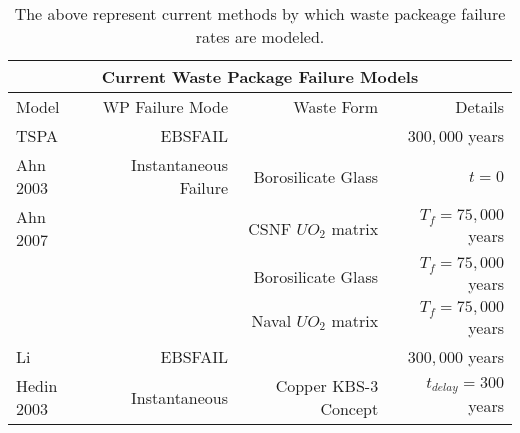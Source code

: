 \begin{table}
\centering
\footnotesize{
\begin{tabular}[h!bt]{|l|r|r|r|}
  \multicolumn{4}{c}{\textbf{Current Waste Package Failure Models}}\\
  \hline
  Model&WP Failure Mode&Waste Form&Details\\
  \hline
  TSPA&EBSFAIL&&$300,000$ years\\
  \hline
  Ahn 2003&Instantaneous Failure&Borosilicate Glass&$t=0$\\
  \hline
  Ahn 2007& &CSNF $UO_2$ matrix &$T_f=75,000$ years\\
  & &Borosilicate Glass &$T_f=75,000$ years\\
  & & Naval $UO_2$ matrix &$T_f=75,000$ years\\
  \hline
  Li&EBSFAIL&&$300,000$ years\\
  \hline
  Hedin 2003& Instantaneous & Copper KBS-3 Concept & $t_{delay} = 300$ years \\
  \hline
\end{tabular}
\label{tab:wpfail}
\caption[Current WP Failure Models]{The above represent current methods by which waste packeage 
failure rates are modeled.}
}
\end{table}

